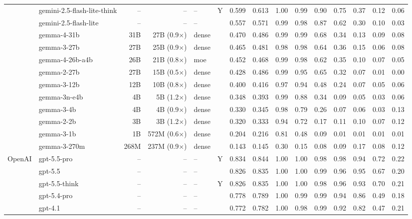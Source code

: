\begin{longtable}{@{}ll r r l c rr rrrrrrr@{}}
 & gemini-2.5-flash-lite-think & -- & -- & -- & Y & 0.599 & 0.613 & 1.00 & 0.99 & 0.90 & 0.75 & 0.37 & 0.12 & 0.06 \\
 & gemini-2.5-flash-lite & -- & -- & -- &  & 0.557 & 0.571 & 0.99 & 0.98 & 0.87 & 0.62 & 0.30 & 0.10 & 0.03 \\
 & gemma-4-31b & 31B & 27B (0.9$\times$) & dense &  & 0.470 & 0.486 & 0.99 & 0.99 & 0.68 & 0.34 & 0.13 & 0.09 & 0.08 \\
 & gemma-3-27b & 27B & 25B (0.9$\times$) & dense &  & 0.465 & 0.481 & 0.98 & 0.98 & 0.64 & 0.36 & 0.15 & 0.06 & 0.08 \\
 & gemma-4-26b-a4b & 26B & 21B (0.8$\times$) & moe &  & 0.452 & 0.468 & 0.99 & 0.98 & 0.62 & 0.35 & 0.10 & 0.07 & 0.05 \\
 & gemma-2-27b & 27B & 15B (0.5$\times$) & dense &  & 0.428 & 0.486 & 0.99 & 0.95 & 0.65 & 0.32 & 0.07 & 0.01 & 0.00 \\
 & gemma-3-12b & 12B & 10B (0.8$\times$) & dense &  & 0.400 & 0.416 & 0.97 & 0.94 & 0.48 & 0.24 & 0.07 & 0.05 & 0.06 \\
 & gemma-3n-e4b & 4B & 5B (1.2$\times$) & dense &  & 0.348 & 0.393 & 0.99 & 0.88 & 0.34 & 0.09 & 0.05 & 0.03 & 0.06 \\
 & gemma-3-4b & 4B & 4B (0.9$\times$) & dense &  & 0.330 & 0.345 & 0.98 & 0.79 & 0.26 & 0.07 & 0.06 & 0.03 & 0.13 \\
 & gemma-2-2b & 3B & 3B (1.2$\times$) & dense &  & 0.320 & 0.333 & 0.94 & 0.72 & 0.17 & 0.11 & 0.10 & 0.07 & 0.12 \\
 & gemma-3-1b & 1B & 572M (0.6$\times$) & dense &  & 0.204 & 0.216 & 0.81 & 0.48 & 0.09 & 0.01 & 0.01 & 0.01 & 0.01 \\
 & gemma-3-270m & 268M & 237M (0.9$\times$) & dense &  & 0.143 & 0.145 & 0.30 & 0.15 & 0.08 & 0.09 & 0.17 & 0.08 & 0.12 \\
OpenAI & gpt-5.5-pro & -- & -- & -- & Y & 0.834 & 0.844 & 1.00 & 1.00 & 0.98 & 0.98 & 0.94 & 0.72 & 0.22 \\
 & gpt-5.5 & -- & -- & -- &  & 0.826 & 0.835 & 1.00 & 1.00 & 0.99 & 0.96 & 0.95 & 0.67 & 0.20 \\
 & gpt-5.5-think & -- & -- & -- & Y & 0.826 & 0.835 & 1.00 & 1.00 & 0.98 & 0.96 & 0.93 & 0.70 & 0.21 \\
 & gpt-5.4-pro & -- & -- & -- &  & 0.778 & 0.789 & 1.00 & 0.99 & 0.99 & 0.94 & 0.86 & 0.49 & 0.18 \\
 & gpt-4.1 & -- & -- & -- &  & 0.772 & 0.782 & 1.00 & 0.98 & 0.99 & 0.92 & 0.82 & 0.47 & 0.21 \\

\end{longtable}
